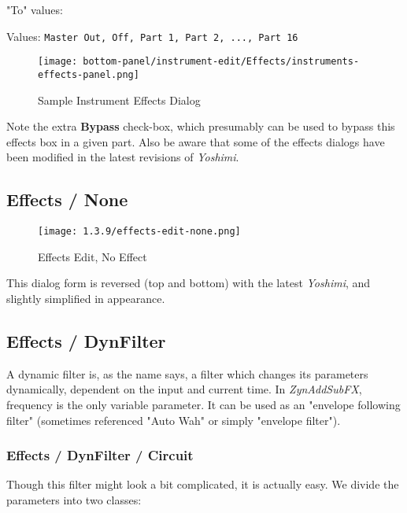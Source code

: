    "To" values:

   Values: \texttt{Master Out, Off, Part 1, Part 2, ..., Part 16}

\begin{figure}[H]
   \centering 
   \texttt{[image: bottom-panel/instrument-edit/Effects/instruments-effects-panel.png]}
   \caption{Sample Instrument Effects Dialog}
   \label{fig:sample_instrument_effects_dialog}
\end{figure}

   Note the extra \textbf{Bypass} check-box, which presumably can be used to
   bypass this effects box in a given part.
   Also be aware that some of the effects dialogs have been modified in the
   latest revisions of \textsl{Yoshimi}.

\subsection{Effects / None}
\label{subsec:effects_edit_none}

\begin{figure}[H]
   \centering 
   \texttt{[image: 1.3.9/effects-edit-none.png]}
   \caption{Effects Edit, No Effect}
   \label{fig:effects_edit_none}
\end{figure}

   This dialog form is reversed (top and bottom) with the latest
   \textsl{Yoshimi}, and slightly simplified in appearance.

\subsection{Effects / DynFilter}
\label{subsec:effects_edit_dynfilter}

   A dynamic filter is, as the name says, a filter which changes its
   parameters dynamically, dependent on the input and current time. In
   \textsl{ZynAddSubFX}, frequency is the only variable parameter. It can be
   used as an "envelope following filter" (sometimes referenced "Auto Wah" or
   simply "envelope filter").

\subsubsection{Effects / DynFilter / Circuit}
\label{subsubsec:effects_edit_dynfilter_circuit}

   Though this filter might look a bit complicated, it is actually easy. We
   divide the parameters into two classes:

